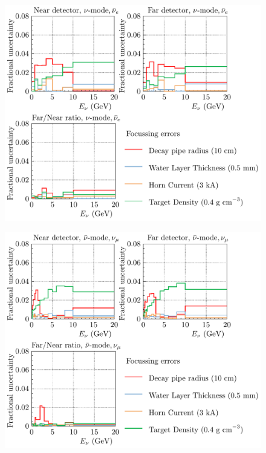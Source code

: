 \documentclass{article}
\begin{document}
\begin{figure}
  \includegraphics[width=\textwidth]{plots/fracerrs/numode_nuebar_Focussing}
  \caption{}
  \label{fig:foc_nu_nuebar}
\end{figure}

\begin{figure}
  \includegraphics[width=\textwidth]{plots/fracerrs/nubarmode_numu_Focussing}
  \caption{}
  \label{fig:foc_nubar_numu}
\end{figure}
\end{document}
